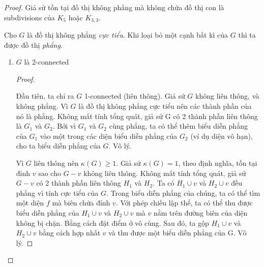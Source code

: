 \begin{proof}
    Giả sử tồn tại đồ thị không phẳng mà không chứa đồ thị con là subdivisions của $K_5$ hoặc $K_{3,3}$.

    Cho $G$ là đồ thị không phẳng \textit{cực tiểu}. Khi loại bỏ một cạnh bất kì của $G$ thì ta được đồ thị \textit{phẳng}.

    \begin{enumerate}
        \item $G$ là 2-connected
              \begin{proof}
                  \begin{center}
                  \end{center}
                  Đầu tiên, ta chỉ ra $G$ 1-connected (liên thông). Giả sử $G$ không liên thông, và không phẳng.
                  Vì $G$ là đồ thị không phẳng cực tiểu nên các thành phần của nó là phẳng. Không mất tính tổng quát, giả sử G có 2 thành phần liên thông là $G_1$ và $G_2$.
                  Bởi vì $G_1$ và $G_2$ cùng phẳng, ta có thể thêm biểu diễn phẳng của $G_1$ vào một trong các diện biểu diễn phẳng của $G_2$ (ví dụ diện vô hạn), cho ta biểu diễn phẳng của $G$. Vô lý.

                  Vì $G$ liên thông nên $\kappa(G) \geq 1$. Giả sử $\kappa(G) = 1$, theo định nghĩa, tồn tại đỉnh $v$ sao cho $G -v$ không liên thông.
                  Không mất tính tổng quát, giả sử $G-v$ có 2 thành phần liên thông $H_1$ và $H_2$.
                  Ta có $H_1 \cup v$ và $H_2 \cup v$ đều phẳng vì tính cực tiểu của $G$.
                  Trong biểu diễn phẳng của chúng, ta có thể tìm một diện $f$ mà biên chứa đỉnh $v$.
                  Với phép chiếu lập thể, ta có thể thu được biểu diễn phẳng của $H_1 \cup v$ và $H_2 \cup v$ mà $v$ nằm trên đường biên của diện không bị chặn.
                  Bằng cách đặt điểm ở vô cùng.
                  Sau đó, ta gộp $H_1 \cup v$ và $H_2 \cup v$ bằng cách hợp nhất $v$ và thu được một biểu diễn phẳng của G. Vô lý.


\end{proof}
\end{enumerate}
\end{proof}
